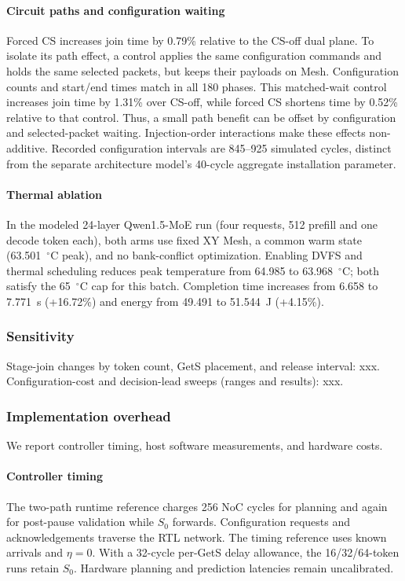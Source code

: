 \documentclass[conference,10pt]{IEEEtran}
\begin{document}
\paragraph{Circuit paths and configuration waiting}
Forced CS increases join time by 0.79\% relative to the CS-off dual plane.
To isolate its path effect, a control applies the same configuration commands
and holds the same selected packets, but keeps their payloads on Mesh.
Configuration counts and start/end times match in all 180 phases. This
matched-wait control increases join time by 1.31\% over CS-off, while forced
CS shortens time by 0.52\% relative to that control. Thus, a small path benefit
can be offset by configuration and selected-packet waiting. Injection-order
interactions make these effects non-additive. Recorded configuration
intervals are 845--925 simulated cycles, distinct from the separate
architecture model's 40-cycle aggregate installation parameter.

\paragraph{Thermal ablation}
In the modeled 24-layer Qwen1.5-MoE run (four requests, 512 prefill and
one decode token each), both arms use fixed XY Mesh, a common warm state
(63.501~$^{\circ}$C peak), and no bank-conflict optimization. Enabling DVFS
and thermal scheduling reduces peak temperature from 64.985 to
63.968~$^{\circ}$C; both satisfy the 65~$^{\circ}$C cap for this batch.
Completion time increases from 6.658 to 7.771~s (+16.72\%) and energy
from 49.491 to 51.544~J (+4.15\%).

\subsubsection{Sensitivity}
Stage-join changes by token count, GetS placement, and release interval:
xxx. Configuration-cost and decision-lead sweeps (ranges and results):
xxx.

\subsubsection{Implementation overhead}
We report controller timing, host software measurements, and hardware costs.

\paragraph{Controller timing}
The two-path runtime reference charges 256 NoC cycles for planning and
again for post-pause validation while $S_0$ forwards. Configuration requests
and acknowledgements traverse the RTL network. The timing reference uses
known arrivals and $\eta=0$. With a 32-cycle per-GetS delay allowance,
the 16/32/64-token runs retain $S_0$. Hardware planning and prediction
latencies remain uncalibrated.
\end{document}
